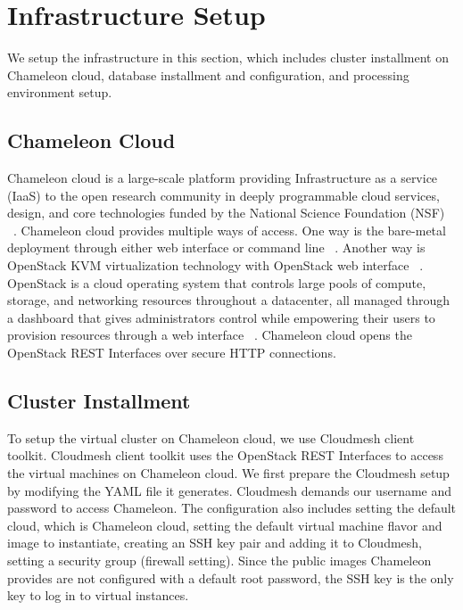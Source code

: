 \documentclass[9pt,twocolumn,twoside]{../../styles/osajnl}
\begin{document}
\section{Infrastructure Setup}


We setup the infrastructure in this section, which includes cluster installment on Chameleon cloud, database installment and configuration, and processing environment setup.


\subsection{Chameleon Cloud}

Chameleon cloud is a large-scale platform providing Infrastructure as a service (IaaS) to the open research community in deeply programmable cloud services, design, and core technologies funded by the National Science Foundation (NSF) ~\cite{www-chame}. Chameleon cloud provides multiple ways of access. One way is the bare-metal deployment through either web interface or command line ~\cite{www-chamemetal}. Another way is OpenStack KVM virtualization technology with OpenStack web interface ~\cite{www-chameopenstack}. OpenStack is a cloud operating system that controls large pools of compute, storage, and networking resources throughout a datacenter, all managed through a dashboard that gives administrators control while empowering their users to provision resources through a web interface ~\cite{www-openstack}. Chameleon cloud opens the OpenStack REST Interfaces over secure HTTP connections.

\subsection{Cluster Installment}

To setup the virtual cluster on Chameleon cloud, we use Cloudmesh client toolkit. Cloudmesh client toolkit uses the OpenStack REST Interfaces to access the virtual machines on Chameleon cloud. We first prepare the Cloudmesh setup by modifying the YAML file it generates. Cloudmesh demands our username and password to access Chameleon. The configuration also includes setting the default cloud, which is Chameleon cloud, setting the default virtual machine flavor and image to instantiate, creating an SSH key pair and adding it to Cloudmesh, setting a security group (firewall setting). Since the public images Chameleon provides are not configured with a default root password, the SSH key is the only key to log in to virtual instances.
\end{document}
